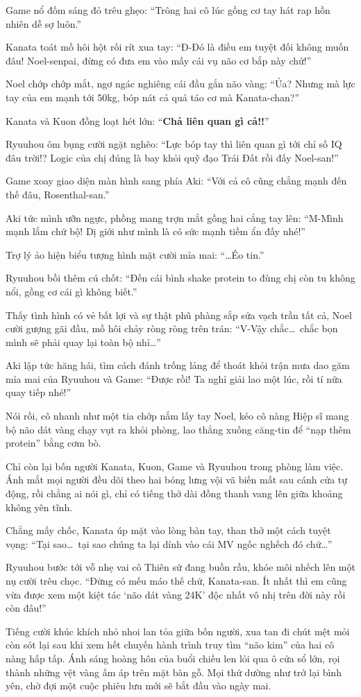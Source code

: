 \documentclass[../main.tex]{subfiles}
\begin{document}
Game nổ đốm sáng đỏ trêu ghẹo: ``Trông hai cô lúc gồng cơ tay hát rap hồn nhiên dễ sợ luôn.''

Kanata toát mồ hôi hột rối rít xua tay: ``Đ-Đó là điều em tuyệt đối không muốn đâu! Noel-senpai, đừng có đưa em vào mấy cái vụ não cơ bắp này chứ!''

Noel chớp chớp mắt, ngơ ngác nghiêng cái đầu gắn não vàng: ``Ủa? Nhưng mà lực tay của em mạnh tới 50kg, bóp nát cả quả táo cơ mà Kanata-chan?''

Kanata và Kuon đồng loạt hét lớn: ``\textbf{Chả liên quan gì cả!!}''

Ryuuhou ôm bụng cười ngặt nghẽo: ``Lực bóp tay thì liên quan gì tới chỉ số IQ đâu trời!? Logic của chị đúng là bay khỏi quỹ đạo Trái Đất rồi đấy Noel-san!''

Game xoay giao diện màn hình sang phía Aki: ``Với cả cô cũng chẳng mạnh đến thế đâu, Rosenthal-san.''

Aki tức mình ưỡn ngực, phồng mang trợn mắt gồng hai cẳng tay lên: ``M-Mình mạnh lắm chứ bộ! Dị giới như mình là có sức mạnh tiềm ẩn đấy nhé!''

Trợ lý ảo hiện biểu tượng hình mặt cười mỉa mai: ``\dots Éo tin.''

Ryuuhou bồi thêm cú chốt: ``Đến cái bình shake protein to đùng chị còn tu không nổi, gồng cơ cái gì không biết.''

Thấy tình hình có vẻ bất lợi và sự thật phũ phàng sắp sửa vạch trần tất cả, Noel cười gượng gãi đầu, mồ hôi chảy ròng ròng trên trán: ``V-Vậy chắc\dots\ chắc bọn mình sẽ phải quay lại toàn bộ nhỉ\dots''

Aki lập tức hăng hái, tìm cách đánh trống lảng để thoát khỏi trận mưa dao găm mỉa mai của Ryuuhou và Game: ``Được rồi! Ta nghỉ giải lao một lúc, rồi tí nữa quay tiếp nhé!''

Nói rồi, cô nhanh như một tia chớp nắm lấy tay Noel, kéo cô nàng Hiệp sĩ mang bộ não dát vàng chạy vụt ra khỏi phòng, lao thẳng xuống căng-tin để ``nạp thêm protein'' bằng cơm bò.

Chỉ còn lại bốn người Kanata, Kuon, Game và Ryuuhou trong phòng làm việc. Ánh mắt mọi người đều dõi theo hai bóng lưng vội vã biến mất sau cánh cửa tự động, rồi chẳng ai nói gì, chỉ có tiếng thở dài đồng thanh vang lên giữa khoảng không yên tĩnh.

Chẳng mấy chốc, Kanata úp mặt vào lòng bàn tay, than thở một cách tuyệt vọng: ``Tại sao\dots\ tại sao chúng ta lại dính vào cái MV ngốc nghếch đó chứ\dots''

Ryuuhou bước tới vỗ nhẹ vai cô Thiên sứ đang buồn rầu, khóe môi nhếch lên một nụ cười trêu chọc. ``Đừng có mếu máo thế chứ, Kanata-san. Ít nhất thì em cũng vừa được xem một kiệt tác `não dát vàng 24K' độc nhất vô nhị trên đời này rồi còn đâu!''

Tiếng cười khúc khích nhỏ nhoi lan tỏa giữa bốn người, xua tan đi chút mệt mỏi còn sót lại sau khi xem hết chuyến hành trình truy tìm ``não kim'' của hai cô nàng hấp tấp. Ánh sáng hoàng hôn của buổi chiều len lỏi qua ô cửa sổ lớn, rọi thành những vệt vàng ấm áp trên mặt bàn gỗ. Mọi thứ dường như trở lại bình yên, chờ đợi một cuộc phiêu lưu mới sẽ bắt đầu vào ngày mai.
\end{document}
